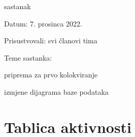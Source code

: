 \begin{packed_enum}
			\item  sastanak
			\item[] \begin{packed_item}
				\item Datum: 7. prosinca 2022.
				\item Prisustvovali: svi članovi tima
				\item Teme sastanka:
				\begin{packed_item}
					\item  priprema za prvo kolokviranje
					\item  izmjene dijagrama baze podataka
				\end{packed_item}
			\end{packed_item}
			
			
		\end{packed_enum}
		
		\eject
		\section*{Tablica aktivnosti}

